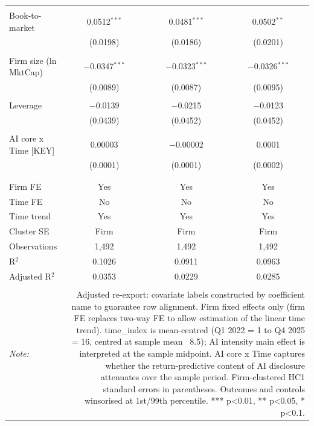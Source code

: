 \begin{table}[!htbp]
\begin{tabular}{@{\extracolsep{5pt}}lccc}
  & & & \\ 
 Book-to-market & 0.0512$^{***}$ & 0.0481$^{***}$ & 0.0502$^{**}$ \\ 
  & (0.0198) & (0.0186) & (0.0201) \\ 
  & & & \\ 
 Firm size (ln MktCap) & $-$0.0347$^{***}$ & $-$0.0323$^{***}$ & $-$0.0326$^{***}$ \\ 
  & (0.0089) & (0.0087) & (0.0095) \\ 
  & & & \\ 
 Leverage & $-$0.0139 & $-$0.0215 & $-$0.0123 \\ 
  & (0.0439) & (0.0452) & (0.0452) \\ 
  & & & \\ 
 AI core x Time  [KEY] & 0.00003 & $-$0.00002 & 0.0001 \\ 
  & (0.0001) & (0.0001) & (0.0002) \\ 
  & & & \\ 
\hline \\[-1.8ex] 
Firm FE & Yes & Yes & Yes \\ 
Time FE & No & No & No \\ 
Time trend & Yes & Yes & Yes \\ 
Cluster SE & Firm & Firm & Firm \\ 
Observations & 1,492 & 1,492 & 1,492 \\ 
R$^{2}$ & 0.1026 & 0.0911 & 0.0963 \\ 
Adjusted R$^{2}$ & 0.0353 & 0.0229 & 0.0285 \\ 
\hline 
\hline \\[-1.8ex] 
\textit{Note:}  & \multicolumn{3}{r}{Adjusted re-export: covariate labels constructed by coefficient name to guarantee row alignment. Firm fixed effects only (firm FE replaces two-way FE to allow estimation of the linear time trend). time_index is mean-centred (Q1 2022 = 1 to Q4 2025 = 16, centred at sample mean ~8.5); AI intensity main effect is interpreted at the sample midpoint. AI core x Time captures whether the return-predictive content of AI disclosure attenuates over the sample period. Firm-clustered HC1 standard errors in parentheses. Outcomes and controls winsorised at 1st/99th percentile. *** p<0.01, ** p<0.05, * p<0.1.} \\ 
\end{tabular} 
\end{table} 
